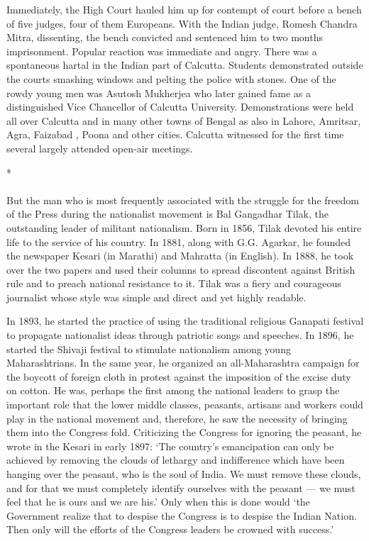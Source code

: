 Immediately, the High Court hauled him up for contempt of court before a bench of five judges, four of them Europeans. With the Indian judge, Romesh Chandra Mitra, dissenting, the bench convicted and sentenced him to two months imprisonment. Popular reaction was immediate and angry. There was a spontaneous hartal in the Indian part of Calcutta. Students demonstrated outside the courts smashing windows and pelting the police with stones. One of the rowdy young men was Asutosh Mukherjea who later gained fame as a distinguished Vice Chancellor of Calcutta University. Demonstrations were held all over Calcutta and in many other towns of Bengal as also in Lahore, Amritsar, Agra, Faizabad , Poona and other cities. Calcutta witnessed for the first time several largely attended open-air meetings.

\begin{center}*\end{center}

\paragraph*{}


But the man who is most frequently associated with the struggle for the freedom of the Press during the nationalist movement is Bal Gangadhar Tilak, the outstanding leader of militant nationalism. Born in 1856, Tilak devoted his entire life to the service of his country. In 1881, along with G.G. Agarkar, he founded the newspaper Kesari (in Marathi) and Mahratta (in English). In 1888, he took over the two papers and used their columns to spread discontent against British rule and to preach national resistance to it. Tilak was a fiery and courageous journalist whose style was simple and direct and yet highly readable.

In 1893, he started the practice of using the traditional religious Ganapati festival to propagate nationalist ideas through patriotic songs and speeches. In 1896, he started the Shivaji festival to stimulate nationalism among young Maharashtrians. In the same year, he organized an all-Maharashtra campaign for the boycott of foreign cloth in protest against the imposition of the excise duty on cotton. He was, perhaps the first among the national leaders to grasp the important role that the lower middle classes, peasants, artisans and workers could play in the national movement and, therefore, he saw the necessity of bringing them into the Congress fold. Criticizing the Congress for ignoring the peasant, he wrote in the Kesari in early 1897: `The country's emancipation can only be achieved by removing the clouds of lethargy and indifference which have been hanging over the peasant, who is the soul of India. We must remove these clouds, and for that we must completely identify ourselves with the peasant --- we must feel that he is ours and we are his.' Only when this is done would `the Government realize that to despise the Congress is to despise the Indian Nation. Then only will the efforts of the Congress leaders be crowned with success.'

